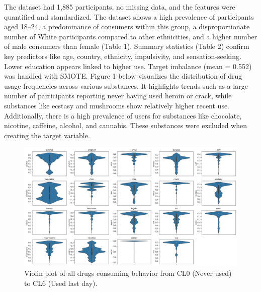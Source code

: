 \documentclass{article}
\begin{document}
The dataset had 1,885 participants, no missing data, and the features were quantified and standardized. The dataset shows a high prevalence of participants aged 18–24, a predominance of consumers within this group, a disproportionate number of White participants compared to other ethnicities, and a higher number of male consumers than female (Table 1). Summary statistics (Table 2) confirm key predictors like age, country, ethnicity, impulsivity, and sensation-seeking. Lower education appears linked to higher use. Target imbalance (mean = 0.552) was handled with SMOTE. Figure 1 below visualizes the distribution of drug usage frequencies across various substances. It highlights trends such as a large number of participants reporting never having used heroin or crack, while substances like ecstasy and mushrooms show relatively higher recent use. Additionally, there is a high prevalence of users for substances like chocolate, nicotine, caffeine, alcohol, and cannabis. These substances were excluded when creating the target variable.

\begin{figure}[h!]
    \centering
    \includegraphics[width=\textwidth]{violin_plots_all_columns.png}
    \caption{Violin plot of all drugs consuming behavior from CL0 (Never used) to CL6 (Used last day).}
    \label{fig:violin_plot}
\end{figure}
\end{document}
